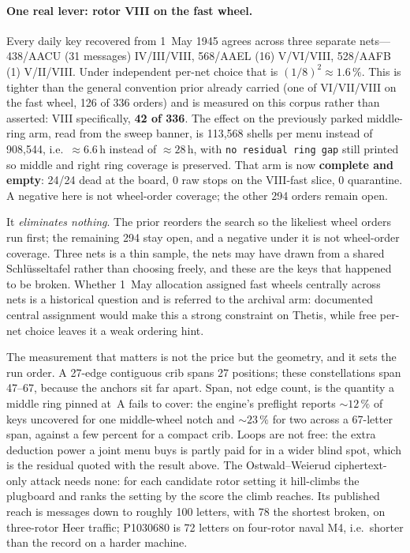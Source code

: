 \documentclass[11pt,a4paper]{article}
\begin{document}
\paragraph{One real lever: rotor VIII on the fast wheel.}
Every daily key recovered from 1~May 1945 agrees across three separate nets---438/AACU
(31 messages) IV/III/VIII, 568/AAEL (16) V/VI/VIII, 528/AAFB (1) V/II/VIII. Under independent
per-net choice that is $(1/8)^2 \approx 1.6\,\%$. This is tighter than the general convention
prior already carried (one of VI/VII/VIII on the fast wheel, 126 of 336 orders) and is
measured on this corpus rather than asserted: VIII specifically, \textbf{42 of 336}. The
effect on the previously parked middle-ring arm, read from the sweep banner, is 113{,}568
shells per menu instead of 908{,}544, i.e.\ ${\approx}6.6$\,h instead of ${\approx}28$\,h,
with \texttt{no residual ring gap} still printed so middle and right ring coverage is
preserved.
That arm is now \textbf{complete and empty}: 24/24 dead at the board, 0 raw stops
on the VIII-fast slice, 0 quarantine. A negative here is not wheel-order coverage;
the other 294 orders remain open.

It \emph{eliminates nothing}. The prior reorders the search so the likeliest wheel orders run
first; the remaining 294 stay open, and a negative under it is not wheel-order coverage. Three
nets is a thin sample, the nets may have drawn from a shared Schl\"usseltafel rather than
choosing freely, and these are the keys that happened to be broken. Whether 1~May allocation
assigned fast wheels centrally across nets is a historical question and is referred to the
archival arm: documented central assignment would make this a strong constraint on Thetis,
while free per-net choice leaves it a weak ordering hint.

The measurement that matters is not the price but the geometry, and it sets the run order.
A 27-edge contiguous crib spans 27 positions; these constellations span 47--67, because the
anchors sit far apart. Span, not edge count, is the quantity a middle ring pinned at~A fails to
cover: the engine's preflight reports ${\sim}12\,\%$ of keys uncovered for one middle-wheel notch
and ${\sim}23\,\%$ for two across a 67-letter span, against a few percent for a compact crib.
Loops are not free: the extra deduction power a joint menu buys is partly paid for in a wider
blind spot, which is the residual quoted with the result above.
The Ostwald--Weierud ciphertext-only attack needs none: for each candidate rotor
setting it hill-climbs the plugboard and ranks the setting by the score the climb
reaches.
Its published reach is messages down to roughly 100 letters, with 78 the shortest
broken, on three-rotor Heer traffic; P1030680 is 72 letters on four-rotor naval
M4, i.e.\ shorter than the record on a harder machine.
\end{document}
